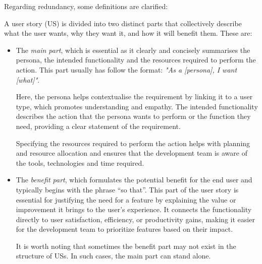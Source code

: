 
Regarding redundancy, some definitions are clarified:
\begin{definition}
	A user story (US) is divided into two distinct parts that collectively describe what the user wants, why they want it, and how it will benefit them. These are:
	\begin{itemize}
		\item The \textit{main part}, which is essential as it clearly and concisely summarises the persona, the intended functionality and the resources required to perform the action. This part usually has follow the format: \textit{"As a [persona], I want [what]"}. 
		
		Here, the persona helps contextualise the requirement by linking it to a user type, which promotes understanding and empathy. The intended functionality describes the action that the persona wants to perform or the function they need, providing a clear statement of the requirement.
		
		Specifying the resources required to perform the action helps with planning and resource allocation and ensures that the development team is aware of the tools, technologies and time required.
		
		\item The \textit{benefit part}, which formulates the potential benefit for the end user and typically begins with the phrase \enquote{so that}. This part of the user story is essential for justifying the need for a feature by explaining the value or improvement it brings to the user's experience. It connects the functionality directly to user satisfaction, efficiency, or productivity gains, making it easier for the development team to prioritize features based on their impact.
		
		It is worth noting that sometimes the benefit part may not exist in the structure of USs. In such cases, the main part can stand alone.
	\end{itemize}
\end{definition}
